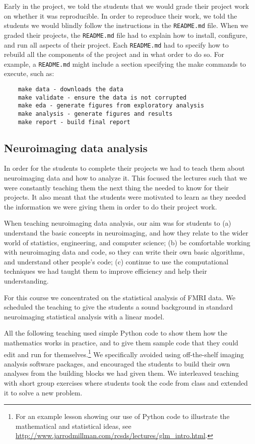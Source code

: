 Early in the project, we told the students that we would grade their project
work on whether it was reproducible.  In order to reproduce their work, we
told the students we would blindly follow the instructions in the
\texttt{README.md} file.
When we graded their projects, the \texttt{README.md} file had to explain how
to install, configure, and run all aspects of their project.
Each \texttt{README.md} had to specify how to rebuild all the components of
the project and in what order to do so.
For example, a \texttt{README.md} might include a section specifying
the make commands to execute, such as:
\begin{verbatim}
    make data - downloads the data 
    make validate - ensure the data is not corrupted
    make eda - generate figures from exploratory analysis
    make analysis - generate figures and results
    make report - build final report
\end{verbatim}

\subsection{Neuroimaging data analysis}\label{analysis}

In order for the students to complete their projects we had to
teach them about neuroimaging data and how to analyze it.
This focused the lectures such that we were constantly teaching
them the next thing the needed to know for their projects.
It also meant that the students were motivated to learn as
they needed the information we were giving them in order
to do their project work.

When teaching neuroimaging data analysis, our aim was for students to
(a) understand the basic concepts in neuroimaging,
and how they relate to the wider world of statistics, engineering, and computer science;
(b) be comfortable working with neuroimaging data and code, so they can write
their own basic algorithms, and understand other people's code;
(c) continue to use the computational techniques we had taught them to improve
efficiency and help their understanding.

For this course we concentrated on the statistical analysis of FMRI data.  We
scheduled the teaching to give the students a sound background in standard
neuroimaging statistical analysis with a linear model.

All the following teaching used simple Python code to show them how the
mathematics works in practice, and to give them sample code that they could
edit and run for themselves.\footnote{For an example lesson showing our use
of Python code to illustrate the mathematical and statistical ideas,
see \url{http://www.jarrodmillman.com/rcsds/lectures/glm_intro.html}.}
We specifically avoided using off-the-shelf imaging analysis software packages,
and encouraged the students to build their own analyses from the building
blocks we had given them.  We interleaved teaching with short group exercises
where students took the code from class and extended it to solve a new problem.

